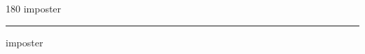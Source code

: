 
\begin{frame}
\begin{center}
\begin{turn}{180}
{\fontsize{2.5cm}{1em}\selectfont imposter}
\end{turn}
\vspace{1em}\par  
\hrule
\vspace{1em}\par  
{\fontsize{2.5cm}{1em}\selectfont imposter}
\end{center}
\end{frame}
